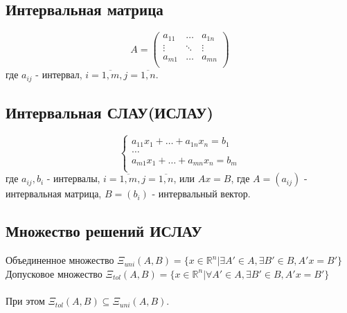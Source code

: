 \documentclass[a4paper]{article}
\begin{document}
        \subsection{Интервальная матрица}
            \begin{equation}
                A=
                    \begin{pmatrix}
                        a_{11} & \dots & a_{1n}\\
                        \vdots & \ddots & \vdots\\
                        a_{m1} & \dots & a_{mn}\\
                    \end{pmatrix}\label{eq:IMATRIX}
            \end{equation}
            где $a_{ij}$ - интервал, $i=\overline{1,m},j=\overline{1,n}$.
        \subsection{Интервальная СЛАУ(ИСЛАУ)}
        \begin{equation}
            \left\{
            \begin{array}{ll}
                a_{11}x_1+\ldots+a_{1n}x_n=b_1\\
                \ldots\\
                a_{m1}x_1+\ldots+a_{mn}x_n=b_m\\
            \end{array}
            \right.\label{eq:ISLAU}
        \end{equation}
        где $a_{ij},b_i$ - интервалы, $i=\overline{1,m},j=\overline{1,n}$, или $Ax=B$, где $A=(a_{ij})$ - интервальная матрица, $B=(b_i)$ - интервальный вектор.
    \subsection{Множество решений ИСЛАУ}
    Объединенное множество $\mathsf{\Xi}_{uni}(A,B)=\{x\in{\mathbb{R}^n}|\exists{A'}\in{A},\exists{B'}\in{B},A'x=B'\}$ \\
    Допусковое множество $\mathsf{\Xi}_{tol}(A,B)=\{x\in{\mathbb{R}^n}|\forall{A'}\in{A},\exists{B'}\in{B},A'x=B'\}$ \\\\
    При этом $\mathsf{\Xi}_{tol}(A,B)\subseteq{\mathsf{\Xi}_{uni}(A,B)}$.
\end{document}
